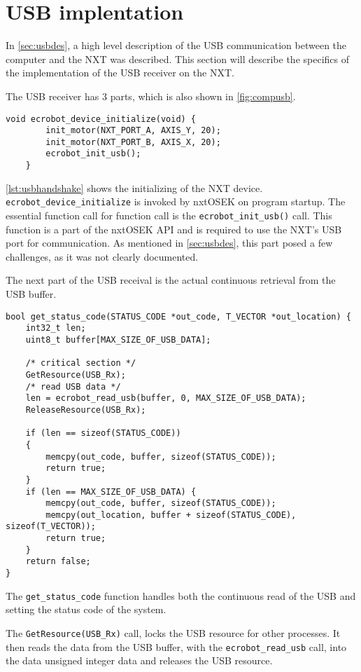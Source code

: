 \section{USB implentation}
\label{sec:usbimp}
In \autoref{sec:usbdes}, a high level description of the USB communication between the computer and the NXT was described.
This section will describe the specifics of the implementation of the USB receiver on the NXT.

The USB receiver has 3 parts, which is also shown in \autoref{fig:compusb}.

\begin{lstlisting}[language=CSharp,label={lst:usbhandshake},caption={ecrobot\_device\_initialize method from nxt.c}]
    void ecrobot_device_initialize(void) {
        init_motor(NXT_PORT_A, AXIS_Y, 20);
        init_motor(NXT_PORT_B, AXIS_X, 20);
        ecrobot_init_usb();
    }
\end{lstlisting}
\autoref{lst:usbhandshake} shows the initializing of the NXT device.
\texttt{ecrobot\_device\_initialize} is invoked by nxtOSEK on program startup.
The essential function call for function call is the \texttt{ecrobot\_init\_usb()} call.
This function is a part of the nxtOSEK API and is required to use the NXT's USB port for communication.
As mentioned in \autoref{sec:usbdes}, this part posed a few challenges, as it was not clearly documented.

The next part of the USB receival is the actual continuous retrieval from the USB buffer.
\begin{lstlisting}[language=CSharp,label={lst:usbreceive},caption={get\_status\_code method from usb.c}]
bool get_status_code(STATUS_CODE *out_code, T_VECTOR *out_location) {
	int32_t len;
	uint8_t buffer[MAX_SIZE_OF_USB_DATA];

	/* critical section */
	GetResource(USB_Rx);
	/* read USB data */
	len = ecrobot_read_usb(buffer, 0, MAX_SIZE_OF_USB_DATA);
	ReleaseResource(USB_Rx);

	if (len == sizeof(STATUS_CODE))
	{
		memcpy(out_code, buffer, sizeof(STATUS_CODE));
		return true;
	}
	if (len == MAX_SIZE_OF_USB_DATA) {
		memcpy(out_code, buffer, sizeof(STATUS_CODE));
		memcpy(out_location, buffer + sizeof(STATUS_CODE), sizeof(T_VECTOR));
		return true;
	}
	return false;
}
\end{lstlisting}
The \texttt{get\_status\_code} function handles both the continuous read of the USB and setting the status code of the system.

The \texttt{GetResource(USB\_Rx)} call, locks the USB resource for other processes.
It then reads the data from the USB buffer, with the \texttt{ecrobot\_read\_usb} call, into the data unsigned integer data and releases the USB resource.

